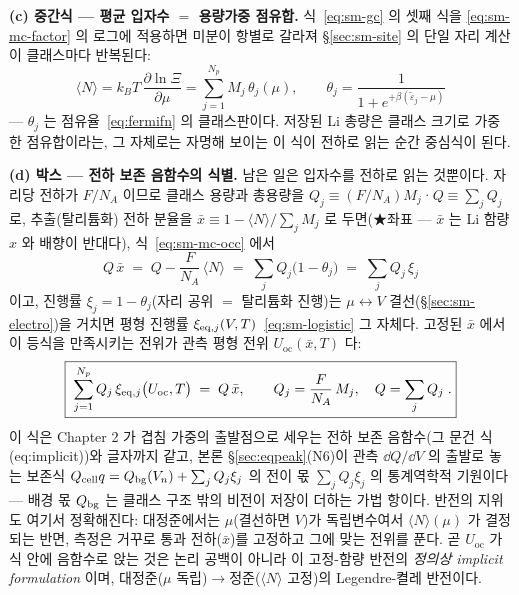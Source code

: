 \textbf{(c) 중간식 --- 평균 입자수 $=$ 용량가중 점유합.} 식~\eqref{eq:sm-gc} 의 셋째 식을
\eqref{eq:sm-mc-factor} 의 로그에 적용하면 미분이 항별로 갈라져 \S\ref{sec:sm-site} 의 단일 자리 계산이
클래스마다 반복된다:
\begin{equation}
\langle N\rangle
=k_BT\,\frac{\partial\ln\Xi}{\partial\mu}
=\sum_{j=1}^{N_p}M_j\,\theta_j(\mu),
\qquad
\theta_j=\frac{1}{1+e^{+\beta(\tilde\varepsilon_j-\mu)}}
\label{eq:sm-mc-occ}
\end{equation}
--- $\theta_j$ 는 점유율~\eqref{eq:fermifn} 의 클래스판이다. 저장된 Li 총량은 클래스 크기로 가중한
점유합이라는, 그 자체로는 자명해 보이는 이 식이 전하로 읽는 순간 중심식이 된다.

\textbf{(d) 박스 --- 전하 보존 음함수의 식별.} 남은 일은 입자수를 전하로 읽는 것뿐이다. 자리당 전하가
$F/N_A$ 이므로 클래스 용량과 총용량을 $Q_j\equiv(F/N_A)M_j$·$Q\equiv\sum_jQ_j$ 로, 추출(탈리튬화) 전하
분율을 $\bar x\equiv1-\langle N\rangle/\sum_jM_j$ 로 두면(★좌표 --- $\bar x$ 는 Li 함량 $x$ 와 배향이
반대다), 식~\eqref{eq:sm-mc-occ} 에서
\[
Q\,\bar x
\;=\;Q-\frac{F}{N_A}\,\langle N\rangle
\;=\;\sum_j Q_j\bigl(1-\theta_j\bigr)
\;=\;\sum_j Q_j\,\xi_j
\]
이고, 진행률 $\xi_j=1-\theta_j$(자리 공위 $=$ 탈리튬화 진행)는 $\mu\leftrightarrow V$
결선(\S\ref{sec:sm-electro})을 거치면 평형 진행률 $\xi_{\mathrm{eq},j}(V,T)$~\eqref{eq:sm-logistic} 그 자체다. 고정된
$\bar x$ 에서 이 등식을 만족시키는 전위가 관측 평형 전위 $U_\mathrm{oc}(\bar x,T)$ 다:
\begin{equation}
\boxed{\;\sum_{j=1}^{N_p} Q_j\,\xi_{\mathrm{eq},j}\bigl(U_\mathrm{oc},T\bigr)\;=\;Q\,\bar x,
\qquad Q_j=\frac{F}{N_A}\,M_j,\quad Q=\sum_jQ_j\;.}
\label{eq:sm-mc-balance}
\end{equation}
이 식은 Chapter 2 가 겹침 가중의 출발점으로 세우는 전하 보존 음함수(그 문건 식 (eq:implicit))와 글자까지
같고, 본론 \S\ref{sec:eqpeak}(N6)이 관측 $\dd Q/\dd V$ 의 출발로 놓는 보존식
$Q_{\mathrm{cell}} q=Q_{\mathrm{bg}}(V_n)+\sum_jQ_j\xi_j$ 의 전이 몫 $\sum_jQ_j\xi_j$ 의 통계역학적 기원이다 --- 배경 몫
$Q_{\mathrm{bg}}$ 는 클래스 구조 밖의 비전이 저장이 더하는 가법 항이다. 반전의 지위도 여기서 정확해진다: 대정준에서는
$\mu$(결선하면 $V$)가 독립변수여서 $\langle N\rangle(\mu)$ 가 결정되는 반면, 측정은 거꾸로 통과 전하($\bar
x$)를 고정하고 그에 맞는 전위를 푼다. 곧 $U_\mathrm{oc}$ 가 식 안에 음함수로 앉는 것은 논리 공백이 아니라 이
고정-함량 반전의 \emph{정의상 implicit formulation} 이며, 대정준($\mu$ 독립)$\to$정준($\langle N\rangle$
고정)의 Legendre-켤레 반전이다.
